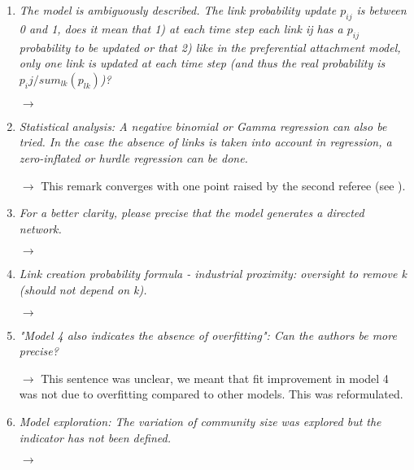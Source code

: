 \documentclass[10pt,a4paper,sans]{moderncv}        %
\begin{document}
\begin{enumerate}
	\medskip



	\item \textit{The model is ambiguously described. The link probability update $p_{ij}$ is between 0 and 1, does it mean that 1) at each time step each link ij has a $p_{ij}$ probability to be updated or that 2) like in the preferential attachment model, only one link is updated at each time step (and thus the real probability is $p_ij/sum_{lk}(p_{lk})$)?}
	
	$\rightarrow$ 
	
	\medskip


	\item \textit{Statistical analysis: A negative binomial or Gamma regression can also be tried. In the case the absence of links is taken into account in regression, a zero-inflated or hurdle regression can be done.}
	 
	$\rightarrow$ This remark converges with one point raised by the second referee (see ).
	
	\medskip


	\item \textit{For a better clarity, please precise that the model generates a directed network.}
	
	$\rightarrow$
	
	\medskip

	\item \textit{Link creation probability formula - industrial proximity: oversight to remove k (should not depend on k).}
	
	$\rightarrow$ 
	
	\medskip

	\item \textit{"Model 4 also indicates the absence of overfitting": Can the authors be more precise?}

	$\rightarrow$ This sentence was unclear, we meant that fit improvement in model 4 was not due to overfitting compared to other models. This was reformulated.
	
	\medskip

	\item \textit{Model exploration: The variation of community size was explored but the indicator has not been defined.}
	
	$\rightarrow$ 

\end{enumerate}
\end{document}
